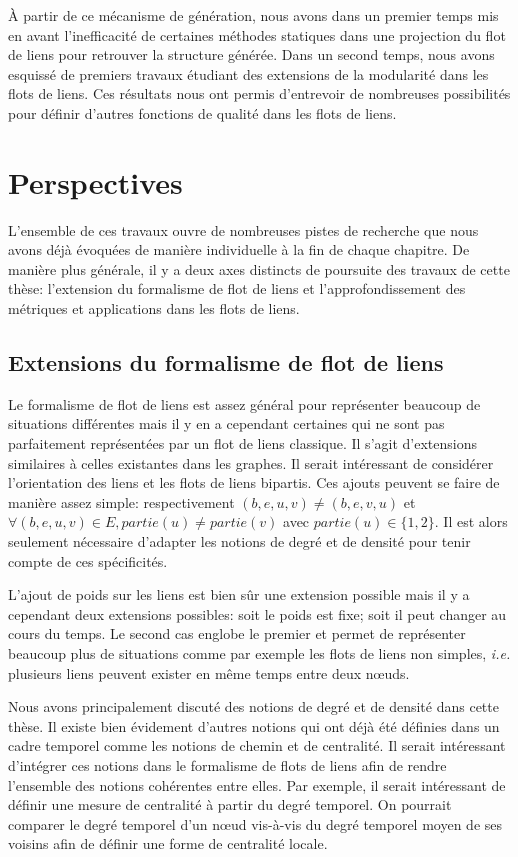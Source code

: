 \`A partir de ce mécanisme de génération, nous avons dans un premier temps mis en avant l'inefficacité de certaines méthodes statiques dans une projection du flot de liens pour retrouver la structure générée.
Dans un second temps, nous avons esquissé de premiers travaux étudiant des extensions de la modularité dans les flots de liens.
Ces résultats nous ont permis d'entrevoir de nombreuses possibilités pour définir d'autres fonctions de qualité dans les flots de liens.

\section{Perspectives}

L'ensemble de ces travaux ouvre de nombreuses pistes de recherche que nous avons déjà évoquées de manière individuelle à la fin de chaque chapitre.
De manière plus générale, il y a deux axes distincts de poursuite des travaux de cette thèse: l'extension du formalisme de flot de liens et l'approfondissement des métriques et applications dans les flots de liens.

\subsection{Extensions du formalisme de flot de liens}

Le formalisme de flot de liens est assez général pour représenter beaucoup de situations différentes mais il y en a cependant certaines qui ne sont pas parfaitement représentées par un flot de liens classique.
Il s'agit d'extensions similaires à celles existantes dans les graphes.
Il serait intéressant de considérer l'orientation des liens et les flots de liens bipartis.
Ces ajouts peuvent se faire de manière assez simple: respectivement $(b,e,u,v)\neq (b,e,v,u)$ et $\forall (b,e,u,v) \in E, partie(u)\neq partie(v)$ avec $partie(u) \in \{1,2\}$.
Il est alors seulement nécessaire d'adapter les notions de degré et de densité pour tenir compte de ces spécificités.

L'ajout de poids sur les liens est bien sûr une extension possible mais il y a cependant deux extensions possibles: soit le poids est fixe; soit il peut changer au cours du temps.
Le second cas englobe le premier et permet de représenter beaucoup plus de situations comme par exemple les flots de liens non simples, \emph{i.e.} plusieurs liens peuvent exister en même temps entre deux n\oe{}uds.

Nous avons principalement discuté des notions de degré et de densité dans cette thèse.
Il existe bien évidement d'autres notions qui ont déjà été définies dans un cadre temporel comme les notions de chemin et de centralité.
Il serait intéressant d'intégrer ces notions dans le formalisme de flots de liens afin de rendre l'ensemble des notions cohérentes entre elles.
Par exemple, il serait intéressant de définir une mesure de centralité à partir du degré temporel.
On pourrait comparer le degré temporel d'un n\oe{}ud vis-à-vis du degré temporel moyen de ses voisins afin de définir une forme de centralité locale.

